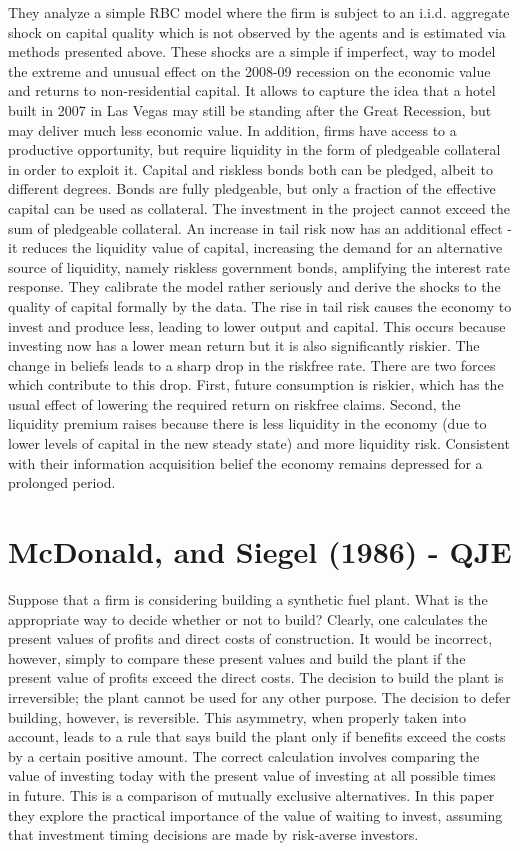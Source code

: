 \documentclass{article}
\begin{document}
{They analyze a simple RBC model where the firm is subject to an i.i.d. aggregate shock on capital quality which is not observed by the agents and is estimated via methods presented above. These shocks are a simple if imperfect, way to model the extreme and unusual effect on the 2008-09 recession on the economic value and returns to non-residential capital. It allows to capture the idea that a hotel built in 2007 in Las Vegas may still be standing after the Great Recession, but may deliver much less economic value. In addition, firms have access to a productive opportunity, but require liquidity in the form of pledgeable collateral in order to exploit it. Capital and riskless bonds both can be pledged, albeit to different degrees. Bonds are fully pledgeable, but only a fraction of the effective capital can be used as collateral. The investment in the project cannot exceed the sum of pledgeable collateral. An increase in tail risk now has an additional effect - it reduces the liquidity value of capital, increasing the demand for an alternative source of liquidity, namely riskless government bonds, amplifying the interest rate response. They calibrate the model rather seriously and derive the shocks to the quality of capital formally by the data. The rise in tail risk causes the economy to invest and produce less, leading to lower output and capital. This occurs because investing now has a lower mean return but it is also significantly riskier. The change in beliefs leads to a sharp drop in the riskfree rate. There are two forces which contribute to this drop. First, future consumption is riskier, which has the usual effect of lowering the required return on riskfree claims. Second, the liquidity premium raises because there is less liquidity in the economy (due to lower levels of capital in the new steady state) and more liquidity risk. Consistent with their information acquisition belief the economy remains depressed for a prolonged period. 


\section*{McDonald, and Siegel (1986) - QJE}


Suppose that a firm is considering building a synthetic fuel plant. What is the appropriate way to decide whether or not to build? Clearly, one calculates the present values of profits and direct costs of construction. It would be incorrect, however, simply to compare these present values and build the plant if the present value of profits exceed the direct costs. The decision to build the plant is irreversible; the plant cannot be used for any other purpose. The decision to defer building, however, is reversible. This asymmetry, when properly taken into account, leads to a rule that says build the plant only if benefits exceed the costs by a certain positive amount. The correct calculation involves comparing the value of investing today with the present value of investing at all possible times in future. This is a comparison of mutually exclusive alternatives. In this paper they explore the practical importance of the value of waiting to invest, assuming that investment timing decisions are made by risk-averse investors.

}
\end{document}

